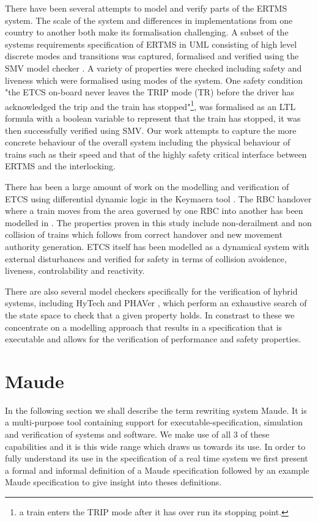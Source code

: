 There have been several attempts to model and verify parts of the ERTMS system. The scale of the system and differences in implementations from one country to another both make its formalisation challenging. A subset of the systems requirements specification of ERTMS in UML consisting of high level discrete modes and transitions was captured, formalised and verified using the SMV model checker \cite{MG14}. A variety of properties were checked including safety and liveness which were formalised using modes of the system. One safety condition  "the ETCS on-board never leaves the TRIP mode (TR) before the driver has acknowledged the trip and the train has stopped"\footnote{a train enters the TRIP mode after it has over run its stopping point.}, was formalised as an LTL formula with a boolean variable to represent that the train has stopped, it was then successfully verified using SMV. Our work attempts to capture the more concrete behaviour of the overall system including the physical behaviour of trains such as their speed and that of the highly safety critical interface between ERTMS and the interlocking. 

There has been a large amount of work on the modelling and verification of ETCS using differential dynamic logic \cite{AP08} in the Keymaera tool \cite{AP08b}. The RBC handover where a train moves from the area governed by one RBC into another has been modelled in \cite{YL11}. The properties proven in this study include non-derailment and non collision of trains which follows from correct handover and new movement authority generation. ETCS \cite{AP09} itself has been modelled as a dynamical system with external disturbances and verified for safety in terms of collision avoidence, liveness, controlability and reactivity.

There are also several model checkers specifically for the verification of hybrid systems, including HyTech \cite{AR96} and PHAVer \cite{GF05}, which perform an exhaustive search of the state space to check that a given property holds. In constrast to these we concentrate on a modelling approach that results in a specification that is executable and allows for the verification of performance and safety properties.

\section{Maude}
In the following section we shall describe the term rewriting system Maude. It is a multi-purpose tool containing support for executable-specification, simulation and verification of systems and software. We make use of all 3 of these capabilities and it is this wide range which draws us towards its use. In order to fully understand its use in the specification of a real time system we first present a formal and informal definition of a Maude specification followed by an example Maude specification to give insight into theses definitions.



